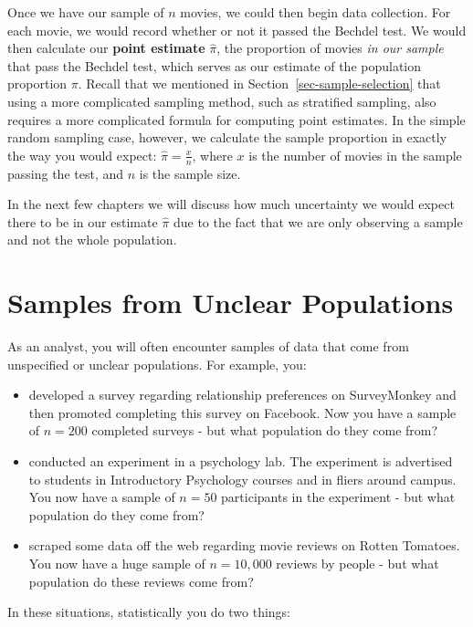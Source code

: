 \documentclass[
  letterpaper,
  DIV=11,
  numbers=noendperiod]{scrreprt}
\providecommand{\tightlist}{%
  \setlength{\itemsep}{0pt}\setlength{\parskip}{0pt}}\usepackage{longtable,booktabs,array}
\theoremstyle{definition}
\theoremstyle{remark}
\begin{document}
Once we have our sample of \(n\) movies, we could then begin data
collection. For each movie, we would record whether or not it passed the
Bechdel test. We would then calculate our \textbf{point estimate}
\(\hat{\pi}\), the proportion of movies \emph{in our sample} that pass
the Bechdel test, which serves as our estimate of the population
proportion \(\pi\). Recall that we mentioned in
Section~\ref{sec-sample-selection} that using a more complicated
sampling method, such as stratified sampling, also requires a more
complicated formula for computing point estimates. In the simple random
sampling case, however, we calculate the sample proportion in exactly
the way you would expect: \(\hat{\pi} = \frac{x}{n}\), where \(x\) is
the number of movies in the sample passing the test, and \(n\) is the
sample size.

In the next few chapters we will discuss how much uncertainty we would
expect there to be in our estimate \(\hat{\pi}\) due to the fact that we
are only observing a sample and not the whole population.

\hypertarget{samples}{%
\section{Samples from Unclear Populations}\label{samples}}

As an analyst, you will often encounter samples of data that come from
unspecified or unclear populations. For example, you:

\begin{itemize}
\tightlist
\item
  developed a survey regarding relationship preferences on SurveyMonkey
  and then promoted completing this survey on Facebook. Now you have a
  sample of \(n = 200\) completed surveys - but what population do they
  come from?
\item
  conducted an experiment in a psychology lab. The experiment is
  advertised to students in Introductory Psychology courses and in
  fliers around campus. You now have a sample of \(n = 50\) participants
  in the experiment - but what population do they come from?
\item
  scraped some data off the web regarding movie reviews on Rotten
  Tomatoes. You now have a huge sample of \(n = 10,000\) reviews by
  people - but what population do these reviews come from?
\end{itemize}

In these situations, statistically you do two things:
\end{document}
